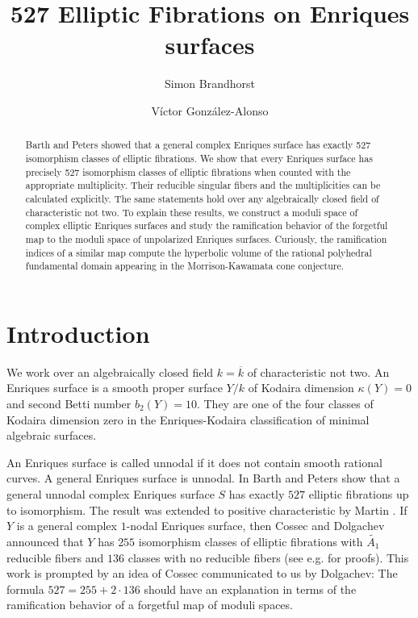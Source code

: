 \documentclass{amsart}
\title[]{527 Elliptic Fibrations on Enriques surfaces}
\author{Simon Brandhorst}
\author{Víctor González-Alonso}
\theoremstyle{definition}
\theoremstyle{plain}
\begin{document}
\begin{abstract}
Barth and Peters showed that a general complex Enriques surface has exactly 527 isomorphism classes of elliptic fibrations.
We show that every Enriques surface has precisely 527 isomorphism classes of elliptic fibrations when counted with the appropriate multiplicity. Their reducible singular fibers and the multiplicities can be calculated explicitly.
The same statements hold over any algebraically closed field of characteristic not two.
To explain these results, we construct a moduli space of complex elliptic Enriques surfaces
and study the ramification behavior of the forgetful map to the moduli space of unpolarized Enriques surfaces.
Curiously, the ramification indices of a similar map compute the hyperbolic volume of the rational polyhedral
fundamental domain appearing in the Morrison-Kawamata cone conjecture.
\end{abstract}
\maketitle
{}
\section{Introduction}
We work over an algebraically closed field $k = \overline{k}$ of characteristic not two.
An Enriques surface is a smooth proper surface $Y/k$ of Kodaira dimension $\kappa(Y)=0$ and second  Betti number $b_2(Y)=10$.  They are one of the four classes of Kodaira dimension zero in the Enriques-Kodaira classification of minimal algebraic surfaces.

An Enriques surface is called unnodal if it does not contain smooth rational curves. A general Enriques surface is unnodal.
In \cite{barth-peters:very_general_enriques} Barth and Peters show that a general unnodal complex Enriques surface $S$ has exactly $527$ elliptic fibrations up to isomorphism.  The result was extended to positive characteristic by Martin \cite{martin:automorphisms_of_unnodal_enriques_surfaces}.
If $Y$ is a general complex $1$-nodal Enriques surface, then Cossec and Dolgachev \cite{cossec-dolgachev:automorphisms_nodal} announced that
$Y$ has $255$ isomorphism classes of elliptic fibrations
with $\tilde{A_1}$ reducible fibers and $136$ classes with no reducible fibers (see e.g. \cite[Section 8.4, Table 8.4]{enriquesII} \cite[6.5]{brandhorst_shimada:tautaubar} for proofs).
This work is prompted by an idea of Cossec communicated to us by Dolgachev: The formula $527=255+2\cdot 136$ should have an explanation in terms of the ramification behavior of a forgetful map of moduli spaces.
\end{document}

